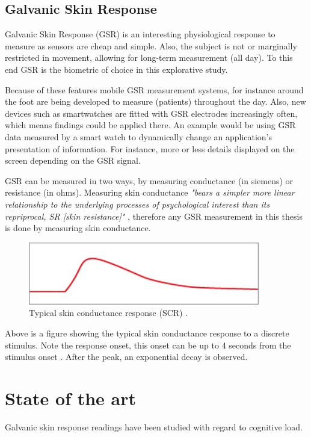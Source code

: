 \documentclass[11pt,leqno,a4paper]{report} %
\begin{document}
\subsection{Galvanic Skin Response}

Galvanic Skin Response (GSR) is an interesting physiological response to measure as sensors are cheap and simple. Also, the subject is not or marginally restricted in movement, allowing for long-term measurement (all day). To this end GSR is the biometric of choice in this explorative study.

Because of these features mobile GSR measurement systems, for instance around the foot \citep{Gravenhorst} are being developed to measure (patients) throughout the day. Also, new devices such as smartwatches are fitted with GSR electrodes increasingly often, which means findings could be applied there. An example would be using GSR data measured by a smart watch to dynamically change an application's presentation of information. For instance, more or less details displayed on the screen depending on the GSR signal.

GSR can be measured in two ways, by measuring conductance (in siemens) or resistance (in ohms). Measuring skin conductance \textit{"bears a simpler more linear relationship to the underlying processes of psychological interest than its repriprocal, SR [skin resistance]"} \citep{lykken1971direct}, therefore any GSR measurement in this thesis is done by measuring skin conductance.

\begin{figure}[H]
  \centering   
    \includegraphics[width=0.9\textwidth]{gsr.jpg}
  \caption{Typical skin conductance response (SCR) \citep{dow_sc_explained_}.}
\end{figure}

Above is a figure showing the typical skin conductance response to a discrete stimulus. Note the response onset, this onset can be up to 4 seconds from the stimulus onset \citep{dow_sc_explained_}. After the peak, an exponential decay is observed.

\pagebreak

\section{State of the art}
Galvanic skin response readings have been studied with regard to cognitive load.
\end{document}
